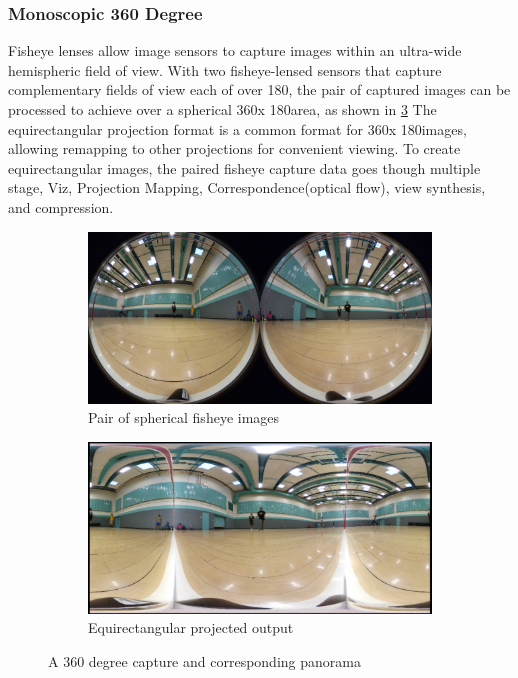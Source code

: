 \subsubsection{Monoscopic 360 Degree}
Fisheye lenses allow image sensors to capture images within an ultra-wide hemispheric field of view. With two fisheye-lensed sensors that capture complementary fields of view each of over 180\textdegree , the pair of captured images can be processed to achieve over a spherical 360\textdegree  x 180\textdegree  area, as shown in \ref{fig:Mono} The equirectangular projection format is a common format for 360\textdegree  x 180\textdegree  images, allowing remapping to other projections for convenient viewing. To create equirectangular images, the paired fisheye capture data  goes though multiple stage, Viz, Projection Mapping, Correspondence(optical flow), view synthesis, and compression.
\begin{figure}[h]
	\centering
	\begin{subfigure}{.5\textwidth}
		\centering
		\includegraphics[width=1\linewidth]{data/images/fisheye_image_pair.jpg}
		\caption{Pair of spherical fisheye images}
		\label{fig:Mono input}
	\end{subfigure}%
	\begin{subfigure}{.5\textwidth}
		\centering
		\includegraphics[width=1\linewidth]{data/images/fisheye_2_equirect.png}
		\caption{Equirectangular projected output}
		\label{fig:Mono Output}
	\end{subfigure}
	\caption{A 360 degree capture and corresponding panorama}
	\label{fig:Mono}
\end{figure}



